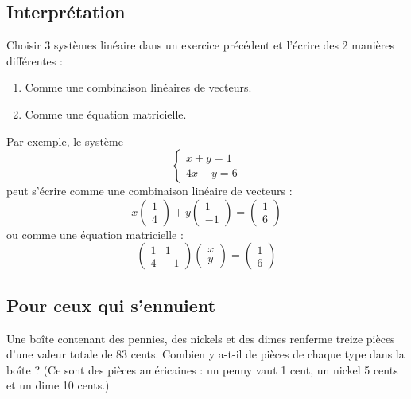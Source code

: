 \vspace{2em}
\subsection{Interprétation}
Choisir 3 systèmes linéaire dans un exercice précédent et l'écrire des 2 manières différentes : 
\begin{enumerate}
\item Comme une combinaison linéaires de vecteurs.
\item Comme une équation matricielle.
\end{enumerate}

Par exemple, le système 
$$\begin{cases}
x + y = 1 \\
4x - y = 6
\end{cases}$$
peut s'écrire comme une combinaison linéaire de vecteurs :
$$x\begin{pmatrix}1\\4\end{pmatrix} + y\begin{pmatrix}1\\-1\end{pmatrix} = \begin{pmatrix}1\\6\end{pmatrix}$$
ou comme une équation matricielle :
$$\begin{pmatrix}1&1\\4&-1\end{pmatrix}\begin{pmatrix}x\\y\end{pmatrix} = \begin{pmatrix}1\\6\end{pmatrix}$$

\vspace{2em}
\subsection{Pour ceux qui s'ennuient}
Une boîte contenant des pennies, des nickels et des dimes renferme treize pièces d'une valeur totale de 83 cents.
Combien y a-t-il de pièces de chaque type dans la boîte ?
(Ce sont des pièces américaines : un penny vaut 1 cent, un nickel 5 cents et un dime 10 cents.)

